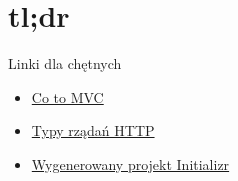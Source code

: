\documentclass{article}
\begin{document}
    \section{tl;dr}
        Linki dla chętnych
        \begin{itemize}
            \item \href{https://en.wikipedia.org/wiki/Model%E2%80%93view%E2%80%93controller}{Co to MVC}
            \item \href{https://developer.mozilla.org/en-US/docs/Web/HTTP/Methods}{Typy rządań HTTP}
            \item \href{https://github.com/ptylczynski/BAI-labo-sketch}{Wygenerowany projekt Initializr}
        \end{itemize}
\end{document}

